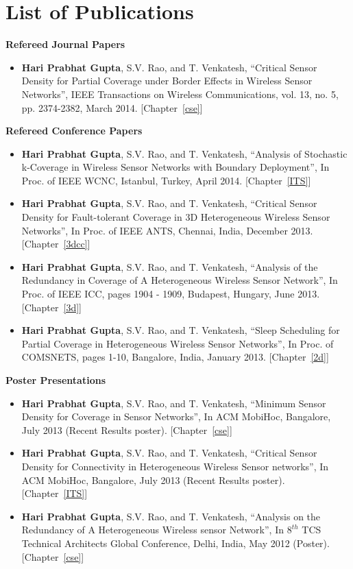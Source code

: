 \newpage
\chapter*{List of Publications}

\noindent \textbf{Refereed Journal Papers}
\begin{itemize}
\item   \textbf{Hari Prabhat Gupta}, S.V. Rao, and T. Venkatesh, ``Critical Sensor Density for Partial Coverage under Border Effects in Wireless Sensor Networks'', IEEE Transactions on Wireless Communications, vol. 13, no. 5, pp. 2374-2382, March 2014. [Chapter~\ref{cse}]
\end{itemize}

\noindent \textbf{Refereed Conference Papers}
\begin{itemize}
\item   \textbf{Hari Prabhat Gupta}, S.V. Rao, and T. Venkatesh, ``Analysis of Stochastic k-Coverage in Wireless Sensor Networks with Boundary Deployment'', In Proc. of IEEE WCNC, Istanbul, Turkey, April 2014. [Chapter~\ref{ITS}]
\item   \textbf{Hari Prabhat Gupta}, S.V. Rao, and T. Venkatesh, ``Critical Sensor Density for Fault-tolerant Coverage in 3D Heterogeneous Wireless Sensor Networks'', In Proc. of IEEE ANTS, Chennai, India, December 2013. [Chapter~\ref{3dcc}]
\item   \textbf{Hari Prabhat Gupta}, S.V. Rao, and T. Venkatesh, ``Analysis of the Redundancy in Coverage of A Heterogeneous Wireless Sensor Network'', In Proc. of IEEE ICC, pages 1904 - 1909, Budapest, Hungary, June 2013. [Chapter~\ref{3d}]
\item   \textbf{Hari Prabhat Gupta}, S.V. Rao, and T. Venkatesh, ``Sleep Scheduling for Partial Coverage in Heterogeneous Wireless Sensor Networks'', In Proc. of COMSNETS,  pages 1-10, Bangalore, India, January 2013. [Chapter~\ref{2d}]
\end{itemize}

\noindent \textbf{Poster Presentations}
\begin{itemize}
\item   \textbf{Hari Prabhat Gupta}, S.V. Rao, and T. Venkatesh, ``Minimum Sensor Density for Coverage in Sensor Networks'', In ACM MobiHoc, Bangalore, July 2013 (Recent Results poster). [Chapter~\ref{cse}]
\item   \textbf{Hari Prabhat Gupta}, S.V. Rao, and T. Venkatesh, ``Critical Sensor Density for Connectivity in Heterogeneous Wireless Sensor networks'', In ACM MobiHoc, Bangalore, July 2013 (Recent Results poster). [Chapter~\ref{ITS}]
\item   \textbf{Hari Prabhat Gupta}, S.V. Rao, and T. Venkatesh, ``Analysis on the Redundancy of A Heterogeneous Wireless sensor Network'', In $8^{th}$ TCS Technical Architects Global Conference, Delhi, India, May 2012 (Poster). [Chapter~\ref{cse}]
\end{itemize}

